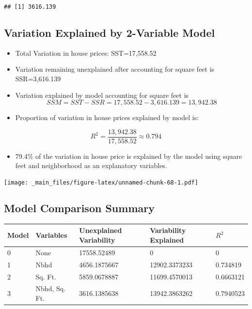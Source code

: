 \documentclass[]{book}
\newenvironment{Shaded}{\begin{snugshade}}{\end{snugshade}}
\newcommand{\KeywordTok}[1]{\textcolor[rgb]{0.13,0.29,0.53}{\textbf{#1}}}
\newcommand{\DecValTok}[1]{\textcolor[rgb]{0.00,0.00,0.81}{#1}}
\newcommand{\OperatorTok}[1]{\textcolor[rgb]{0.81,0.36,0.00}{\textbf{#1}}}
\newcommand{\NormalTok}[1]{#1}
\providecommand{\tightlist}{%
  \setlength{\itemsep}{0pt}\setlength{\parskip}{0pt}}
\begin{document}
\begin{Shaded}
\end{Shaded}

\begin{verbatim}
## [1] 3616.139
\end{verbatim}

\subsection{Variation Explained by 2-Variable
Model}\label{variation-explained-by-2-variable-model}

\begin{itemize}
\item
  Total Variation in house prices: SST=17,558.52\\
\item
  Variation remaining unexplained after accounting for square feet is
  SSR=3,616.139\\
\item
  Variation explained by model accounting for square feet is
  \[SSM=SST-SSR=17,558.52 - 3,616.139 = 13,942.38\]
\item
  Proportion of variation in house prices explained by model is:
\end{itemize}

\[ R^2 = \frac{13,942.38}{17,558.52}\approx0.794 \]

\begin{itemize}
\tightlist
\item
  79.4\% of the variation in house price is explained by the model using
  square feet and neighborhood as an explanatory variables.
\end{itemize}

\texttt{[image: \_main\_files/figure-latex/unnamed-chunk-68-1.pdf]}

\subsection{Model Comparison Summary}\label{model-comparison-summary}

\begin{longtable}[]{@{}lllll@{}}
\toprule
Model & Variables & Unexplained Variability & Variability Explained &
\(R^2\)\tabularnewline
\midrule
\endhead
0 & None & 17558.52489 & 0 & 0\tabularnewline
1 & Nbhd & 4656.1875667 & 12902.3373233 & 0.734819\tabularnewline
2 & Sq. Ft. & 5859.0678887 & 11699.4570013 & 0.6663121\tabularnewline
3 & Nbhd, Sq. Ft. & 3616.1385638 & 13942.3863262 &
0.7940523\tabularnewline
\bottomrule
\end{longtable}
\end{document}
